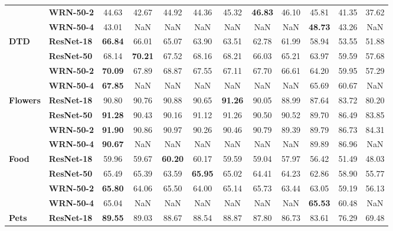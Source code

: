 \begin{table}
\begin{tabular}{l|l|cccccccccc}
       & \textbf{WRN-50-2} &             44.63 & 42.67 & 44.92 & 44.36 & 45.32 & \textbf{46.83} & 46.10 & 45.81 & 41.35 & 37.62 \\
       & \textbf{WRN-50-4} &             43.01 &   NaN &   NaN &   NaN &   NaN &   NaN &   NaN & \textbf{48.73} & 43.26 &   NaN \\
\cline{1-12}
\multirow{4}{*}{\textbf{DTD}} & \textbf{ResNet-18} &             \textbf{66.84} & 66.01 & 65.07 & 63.90 & 63.51 & 62.78 & 61.99 & 58.94 & 53.55 & 51.88 \\
       & \textbf{ResNet-50} &             68.14 & \textbf{70.21} & 67.52 & 68.16 & 68.21 & 66.03 & 65.21 & 63.97 & 59.59 & 57.68 \\
       & \textbf{WRN-50-2} &             \textbf{70.09} & 67.89 & 68.87 & 67.55 & 67.11 & 67.70 & 66.61 & 64.20 & 59.95 & 57.29 \\
       & \textbf{WRN-50-4} &             \textbf{67.85} &   NaN &   NaN &   NaN &   NaN &   NaN &   NaN & 65.69 & 60.67 &   NaN \\
\cline{1-12}
\multirow{4}{*}{\textbf{Flowers}} & \textbf{ResNet-18} &             90.80 & 90.76 & 90.88 & 90.65 & \textbf{91.26} & 90.05 & 88.99 & 87.64 & 83.72 & 80.20 \\
       & \textbf{ResNet-50} &             \textbf{91.28} & 90.43 & 90.16 & 91.12 & 91.26 & 90.50 & 90.52 & 89.70 & 86.49 & 83.85 \\
       & \textbf{WRN-50-2} &             \textbf{91.90} & 90.86 & 90.97 & 90.26 & 90.46 & 90.79 & 89.39 & 89.79 & 86.73 & 84.31 \\
       & \textbf{WRN-50-4} &             \textbf{90.67} &   NaN &   NaN &   NaN &   NaN &   NaN &   NaN & 89.89 & 86.96 &   NaN \\
\cline{1-12}
\multirow{4}{*}{\textbf{Food}} & \textbf{ResNet-18} &             59.96 & 59.67 & \textbf{60.20} & 60.17 & 59.59 & 59.04 & 57.97 & 56.42 & 51.49 & 48.03 \\
       & \textbf{ResNet-50} &             65.49 & 65.39 & 63.59 & \textbf{65.95} & 65.02 & 64.41 & 64.23 & 62.86 & 58.90 & 55.77 \\
       & \textbf{WRN-50-2} &             \textbf{65.80} & 64.06 & 65.50 & 64.00 & 65.14 & 65.73 & 63.44 & 63.05 & 59.19 & 56.13 \\
       & \textbf{WRN-50-4} &             65.04 &   NaN &   NaN &   NaN &   NaN &   NaN &   NaN & \textbf{65.53} & 60.48 &   NaN \\
\cline{1-12}
\multirow{4}{*}{\textbf{Pets}} & \textbf{ResNet-18} &             \textbf{89.55} & 89.03 & 88.67 & 88.54 & 88.87 & 87.80 & 86.73 & 83.61 & 76.29 & 69.48 \\

\end{tabular}
\end{table}
